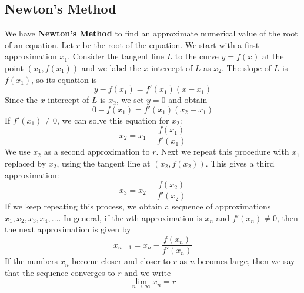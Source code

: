 \subsection{Newton's Method}

We have \textbf{Newton's Method} to find an approximate numerical value of the
root of an equation.
Let \(r\) be the root of the equation.
We start with a first approximation \(x_1\).
Consider the tangent line \(L\) to the curve \(y=f(x)\) at the point
\((x_1,f(x_1))\) and we label the \(x\)-intercept of \(L\) as \(x_2\).
The slope of \(L\) is \(f(x_1)\), so its equation is
\[y-f(x_1)=f'(x_1)(x-x_1)\]
Since the \(x\)-intercept of \(L\) is \(x_2\), we set \(y=0\) and obtain
\[0-f(x_1)=f'(x_1)(x_2-x_1)\]
If \(f'(x_1)\neq 0\), we can solve this equation for \(x_2\):
\[x_2=x_1-\frac{f(x_1)}{f'(x_1)}\]
We use \(x_2\) as a second approximation to \(r\).
Next we repeat this procedure with \(x_1\) replaced by \(x_2\), using the
tangent line at \((x_2,f(x_2))\).
This gives a third approximation:
\[x_3=x_2-\frac{f(x_2)}{f'(x_2)}\]
If we keep repeating this process, we obtain a sequence of approximations
\(x_1,x_2,x_3,x_4,\dots\).
In general, if the \(n\)th approximation is \(x_n\) and \(f'(x_n)\neq 0\),
then the next approximation is given by
\[x_{n+1}=x_n-\frac{f(x_n)}{f'(x_n)}\]
If the numbers \(x_n\) become closer and closer to \(r\) as \(n\) becomes
large, then we say that the sequence converges to \(r\) and we write
\[\lim_{n\to\infty}x_n=r\]